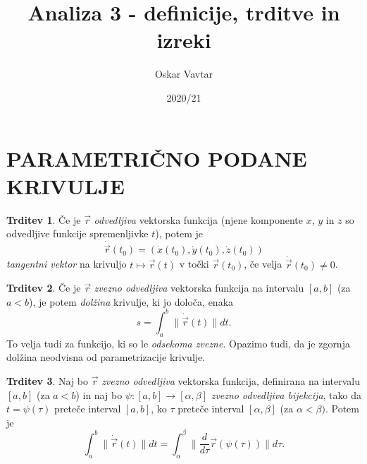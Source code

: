 \documentclass[11pt]{article}
\title{Analiza 3 - definicije, trditve in izreki}
\author{Oskar Vavtar}
\date{2020/21}
\theoremstyle{definition}
\theoremstyle{definition}
\newtheorem{trditev}{Trditev}[section]
\theoremstyle{definition}
\begin{document}
\maketitle
\pagebreak
\tableofcontents
\pagebreak

\section{PARAMETRIČNO PODANE KRIVULJE}
\vspace{0.5cm}	

\begin{trditev}

Če je $\vec{r}$ \textit{odvedljiva} vektorska funkcija (njene komponente $x$, $y$ in $z$ so odvedljive funkcije spremenljivke $t$), potem je
$$\dot{\vec{r}}(t_0) = (\dot{x}(t_0), \dot{y}(t_0), \dot{z}(t_0))$$
\textit{tangentni vektor} na krivuljo $t \mapsto \vec{r}(t)$ v točki $\vec{r}(t_0)$, če velja $\dot{\vec{r}}(t_0) \neq 0$.
	
\end{trditev}
\vspace{0.5cm}

\begin{trditev}

Če je $\vec{r}$ \textit{zvezno odvedljiva} vektorska funkcija na intervalu $[a, b]$ (za	$a < b$), je potem \textit{dolžina} krivulje, ki jo določa, enaka
$$s = \int_{a}^{b} \| \dot{\vec{r}}(t) \| dt.$$
To velja tudi za funkcijo, ki so le \textit{odsekoma zvezne}. Opazimo tudi, da je zgornja dolžina neodvisna od parametrizacije krivulje.	

\end{trditev}
\vspace{0.5cm}

\begin{trditev}

Naj bo $\vec{r}$ \textit{zvezno odvedljiva} vektorska funkcija, definirana na intervalu $[a, b]$ (za $a < b$) in naj bo $\psi: [a, b] \rightarrow [\alpha, \beta]$ \textit{zvezno odvedljiva bijekcija}, tako da $t = \psi(\tau)$ preteče interval $[a, b]$, ko $\tau$ preteče interval $[\alpha, \beta]$ (za $\alpha < \beta)$. Potem je
$$\int_{a}^{b} \| \dot{\vec{r}}(t) \| dt = \int_{\alpha}^{\beta} \| \frac{d}{d \tau} \vec{r}(\psi(\tau)) \| d\tau. $$

\end{trditev}
\vspace{0.5cm}

\end{document}
